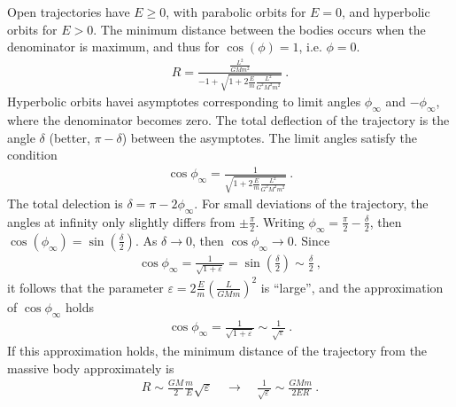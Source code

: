 \documentclass[letterpaper,10pt,english]{jupyterBook}
\begin{document}
\sphinxAtStartPar
Open trajectories have \(E \ge 0\), with parabolic orbits for \(E = 0\), and hyperbolic orbits for \(E > 0\). The minimum distance between the bodies occurs when the denominator is maximum, and thus for \(\cos( \phi ) = 1\), i.e. \(\phi = 0\).
\begin{equation*}
\begin{split}R = \frac{\frac{L^2}{G M m^2}}{-1 + \sqrt{1 + 2 \frac{E}{m} \frac{L^2}{G^2 M^2 m^2}} } \ .\end{split}
\end{equation*}
\sphinxAtStartPar
Hyperbolic orbits havei asymptotes corresponding to limit angles \(\phi_\infty\) and \(-\phi_{\infty}\), where the denominator becomes zero. The total deflection of the trajectory is the angle \(\delta\) (better, \(\pi - \delta\)) between the asymptotes. The limit angles satisfy the condition
\begin{equation*}
\begin{split}\cos \phi_{\infty} = \frac{1}{\sqrt{1 + 2 \frac{E}{m} \frac{L^2}{G^2 M^2 m^2}}} \ .\end{split}
\end{equation*}
\sphinxAtStartPar
The total delection is \(\delta = \pi - 2 \phi_\infty\). For small deviations of the trajectory, the angles at infinity only slightly differs from \(\pm \frac{\pi}{2}\). Writing \(\phi_{\infty} = \frac{\pi}{2} - \frac{\delta}{2}\), then \(\cos(\phi_{\infty}) = \sin\left( \frac{\delta}{2} \right)\). As \(\delta \to 0\), then \(\cos \phi_\infty \to 0\). Since
\begin{equation*}
\begin{split}\cos \phi_\infty = \frac{1}{\sqrt{1 + \varepsilon}} = \sin\left( \frac{\delta}{2} \right) \sim \frac{\delta}{2} \ ,\end{split}
\end{equation*}
\sphinxAtStartPar
it follows that the parameter \(\varepsilon = 2 \frac{E}{m} \left( \frac{L}{GMm} \right)^2\) is “large”, and the approximation of \(\cos \phi_\infty\) holds
\begin{equation*}
\begin{split}\cos \phi_\infty = \frac{1}{\sqrt{1 + \varepsilon}} \sim \frac{1}{\sqrt{\varepsilon}} \ .\end{split}
\end{equation*}
\sphinxAtStartPar
If this approximation holds, the minimum distance of the trajectory from the massive body approximately is
\begin{equation*}
\begin{split}R  \sim \frac{G M}{2} \frac{m}{E} \sqrt{\varepsilon} \quad \rightarrow \quad  \frac{1}{\sqrt{\varepsilon}} \sim \frac{GMm}{2ER} \ .\end{split}
\end{equation*}
\end{document}
